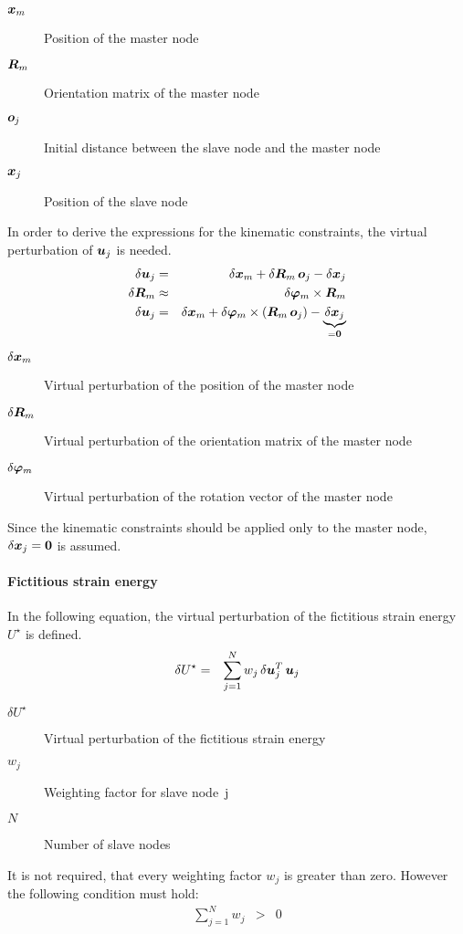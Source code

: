 \begin{description}
\item[$\bm{x}_m$] Position of the master node
\item[$\bm{R}_m$] Orientation matrix of the master node
\item[$\bm{o}_j$] Initial distance between the slave node and the master node
\item[$\bm{x}_j$] Position of the slave node
\end{description}
In order to derive the expressions for the kinematic constraints, the virtual perturbation of $\bm{u}_j$ is needed.
\begin{eqnarray}
\delta\bm{u}_j & = & \delta\bm{x}_m + \delta\bm{R}_m \, \bm{o}_j - \delta\bm{x}_j \\
\delta\bm{R}_m & \approx & \delta\bm{\varphi}_m \times \bm{R}_m \\
\delta\bm{u}_j & = & \delta\bm{x}_m + \delta\bm{\varphi}_m \times \left( \bm{R}_m \, \bm{o}_j \right) - \underbrace{\delta{\bm{x}}_j}_{=\bm{0}} \label{eq:rbdispjoint:deltau}
\end{eqnarray}
\begin{description}
\item[$\delta\bm{x}_m$] Virtual perturbation of the position of the master node
\item[$\delta\bm{R}_m$] Virtual perturbation of the orientation matrix of the master node
\item[$\delta\bm{\varphi}_m$] Virtual perturbation of the rotation vector of the master node
\end{description}
Since the kinematic constraints should be applied only to the master node, $\delta\bm{x}_j=\bm{0}$ is assumed.
\paragraph{Fictitious strain energy}
In the following equation, the virtual perturbation of the fictitious strain energy $U^{\star}$ is defined.
\begin{eqnarray}
\delta U^{\star} & = & \sum_{j=1}^{N} w_j \, \delta\bm{u}_j^T \, \bm{u}_j \label{eq:rbdispjoint:deltaU}
\end{eqnarray}
\begin{description}
\item[$\delta U^{\star}$] Virtual perturbation of the fictitious strain energy
\item[$w_j$] Weighting factor for slave node~j
\item[$N$] Number of slave nodes
\end{description}
It is not required, that every weighting factor $w_j$ is greater than zero. However the following condition must hold:
\begin{eqnarray}
\sum_{j=1}^N w_j &>& 0
\end{eqnarray}

